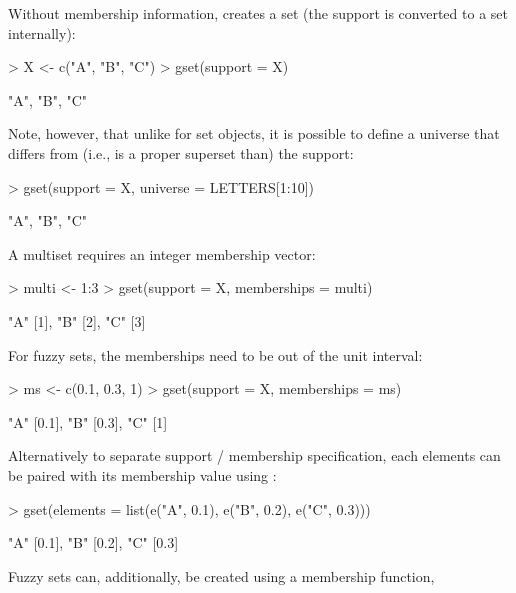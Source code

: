 \documentclass[article]{jss}
\newcommand{\class}[1]{\textsf{#1}}
\newcommand{\codefun}[1]{\code{#1()}}
\begin{document}
\noindent Without membership information, \codefun{gset} creates a set (the support is converted to a set internally):
\begin{Schunk}
\begin{Sinput}
> X <- c("A", "B", "C")
> gset(support = X)
\end{Sinput}
\begin{Soutput}
{"A", "B", "C"}
\end{Soutput}
\end{Schunk}
Note, however, that unlike for \class{set} objects, it is possible to
define a universe that differs from (i.e., is a proper superset than)
the support:
\begin{Schunk}
\begin{Sinput}
> gset(support = X, universe = LETTERS[1:10])
\end{Sinput}
\begin{Soutput}
{"A", "B", "C"}
\end{Soutput}
\end{Schunk}
A multiset requires an integer membership vector:
\begin{Schunk}
\begin{Sinput}
> multi <- 1:3
> gset(support = X, memberships = multi)
\end{Sinput}
\begin{Soutput}
{"A" [1], "B" [2], "C" [3]}
\end{Soutput}
\end{Schunk}
For fuzzy sets, the memberships need to be out of the unit interval:
\begin{Schunk}
\begin{Sinput}
> ms <- c(0.1, 0.3, 1)
> gset(support = X, memberships = ms)
\end{Sinput}
\begin{Soutput}
{"A" [0.1], "B" [0.3], "C" [1]}
\end{Soutput}
\end{Schunk}
Alternatively to separate support / membership specification, each
elements can be paired with its membership value using \codefun{e}:
\begin{Schunk}
\begin{Sinput}
> gset(elements = list(e("A", 0.1), e("B", 0.2), e("C", 0.3)))
\end{Sinput}
\begin{Soutput}
{"A" [0.1], "B" [0.2], "C" [0.3]}
\end{Soutput}
\end{Schunk}
Fuzzy sets can, additionally, be created using a membership function,
\end{document}
